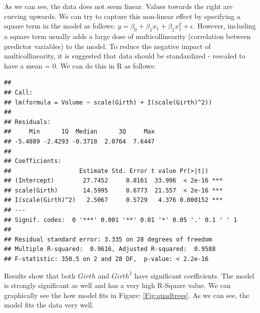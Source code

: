 \documentclass[11pt, letterpaper, twoside]{memoir}\usepackage{knitr}
\begin{document}
As we can see, the data does not seem linear. Values towards the right are curving upwards. We can try to capture this non-linear effect by specifying a square term in the model as follows: $ y = \beta_0 + \beta_1 x_1 + \beta_1 x_1^2 + \epsilon $. However, including a square term usually adds a large dose of multicollinearity (correlation between predictor variables) to the model. To reduce the negative impact of multicollinearity, it is suggested that data should be standardized - rescaled to have a mean = 0. We can do this in R as follows:
\begin{knitrout}
\color{fgcolor}\begin{kframe}
\begin{alltt}
 \hlkwb{<-}  \hlopt{~}  \hlopt{+} \hlstd{(}\hlopt{^}\hlstd{))}
\end{alltt}
\begin{verbatim}
## 
## Call:
## lm(formula = Volume ~ scale(Girth) + I(scale(Girth)^2))
## 
## Residuals:
##     Min      1Q  Median      3Q     Max 
## -5.4889 -2.4293 -0.3718  2.0764  7.6447 
## 
## Coefficients:
##                   Estimate Std. Error t value Pr(>|t|)    
## (Intercept)        27.7452     0.8161  33.996  < 2e-16 ***
## scale(Girth)       14.5995     0.6773  21.557  < 2e-16 ***
## I(scale(Girth)^2)   2.5067     0.5729   4.376 0.000152 ***
## ---
## Signif. codes:  0 '***' 0.001 '**' 0.01 '*' 0.05 '.' 0.1 ' ' 1
## 
## Residual standard error: 3.335 on 28 degrees of freedom
## Multiple R-squared:  0.9616,	Adjusted R-squared:  0.9588 
## F-statistic: 350.5 on 2 and 28 DF,  p-value: < 2.2e-16
\end{verbatim}
\end{kframe}
\end{knitrout}

Results show that both $Girth$ and $Girth^2$ have significant coefficients. The model is strongly significant as well and has a very high R-Square value. We can graphically see the how model fits in Figure: \ref{Fig:quadtrees}. As we can see, the model fits the data very well.
\end{document}
